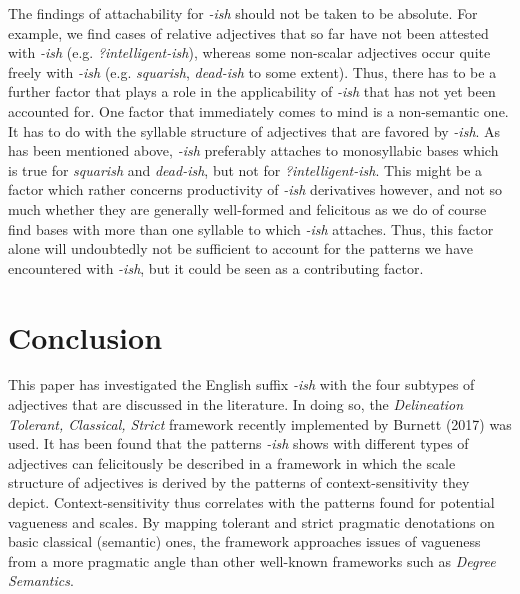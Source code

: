 \documentclass[output=paper
,modfonts
,nonflat]{langsci/langscibook}
\begin{document}
The findings of attachability for \textit{-ish} should not be taken to be absolute. For example, we find cases of relative adjectives that so far have not been attested with \textit{-ish} (e.g. \textit{?intelligent-ish}), whereas some non-scalar adjectives occur quite freely with \textit{-ish} (e.g. \textit{squarish}, \textit{dead-ish} to some extent). Thus, there has to be a further factor that plays a role in the applicability of \textit{-ish} that has not yet been accounted for. One factor that immediately comes to mind is a non-semantic one. It has to do with the syllable structure of adjectives that are favored by \textit{-ish}. As has been mentioned above, \textit{-ish} preferably attaches to monosyllabic bases which is true for \textit{squarish} and \textit{dead-ish}, but not for \textit{?intelligent-ish}. This might be a factor which rather concerns productivity of \textit{-ish} derivatives however, and not so much whether they are generally well-formed and felicitous as we do of course find bases with more than one syllable to which \textit{-ish} attaches. Thus, this factor alone will undoubtedly not be sufficient to account for the patterns we have encountered with \textit{-ish}, but it could be seen as a contributing factor.

\section{Conclusion}
\label{sec:summary}

This paper has investigated the English suffix \textit{-ish} with the four subtypes of adjectives that are discussed in the literature. In doing so, the \textit{Delineation Tolerant, Classical, Strict} framework recently implemented by Burnett (2017) was used. It has been found that the patterns \textit{-ish} shows with different types of adjectives can felicitously be described in a framework in which the scale structure of adjectives is derived by the patterns of context-sensitivity they depict. Context-sensitivity thus correlates with the patterns found for potential vagueness and scales. By mapping tolerant and strict pragmatic denotations on basic classical (semantic) ones, the framework approaches issues of vagueness from a more pragmatic angle than other well-known frameworks such as \textit{Degree Semantics}.
\end{document}
